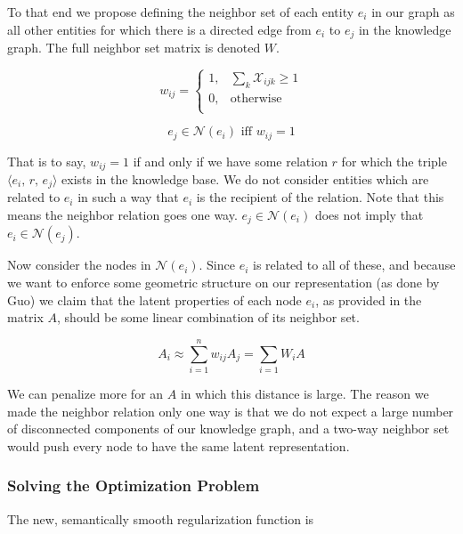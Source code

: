 \documentclass[pageno]{jpaper}
\begin{document}
To that end we propose defining the neighbor set of each entity $e_i$ in our graph
as all other entities for which there is a directed edge from $e_i$ to $e_j$ in
the knowledge graph. The full neighbor set matrix is denoted $W$.

\begin{equation}
    \label{eq: new wij}
    w_{ij} =
    \begin{cases}
        1, & \sum_k \mathcal{X}_{ijk} \geq 1 \\
        0, & \text{otherwise} \\
    \end{cases}
\end{equation}

\begin{equation}
    \label{eq: new neighbor set}
    e_j \in \mathcal{N}(e_i) \text{ iff } w_{ij} = 1
\end{equation}

That is to say, $w_{ij} = 1$ if and only if we have some relation $r$ for which
the triple $\langle e_i,\,r,\,e_j \rangle$ exists in the knowledge base. We do
not consider entities which are related to $e_i$ in such a way that $e_i$ is the
recipient of the relation. Note that this means the neighbor relation goes one
way. $e_j \in \mathcal{N}(e_i)$ does not imply that $e_i \in \mathcal{N}(e_j)$.

Now consider the nodes in $\mathcal{N}(e_i)$. Since $e_i$ is related to all of
these, and because we want to enforce some geometric structure on our
representation (as done by Guo) we claim that the latent properties of each node
$e_i$, as provided in the matrix $A$, should be some linear combination of its
neighbor set.

$$ A_i \approx \sum_{i=1}^n w_{ij}A_j = \sum_{i=1} W_iA$$

 We can penalize more for an $A$ in which this distance is large. The reason we
 made the neighbor relation only one way is that we do not expect a large number
 of disconnected components of our knowledge graph, and a two-way neighbor set
 would push every node to have the same latent representation. \\

\subsubsection{Solving the Optimization Problem}
\label{Solving the Optimization Problem}

The new, semantically smooth regularization function is
\end{document}
